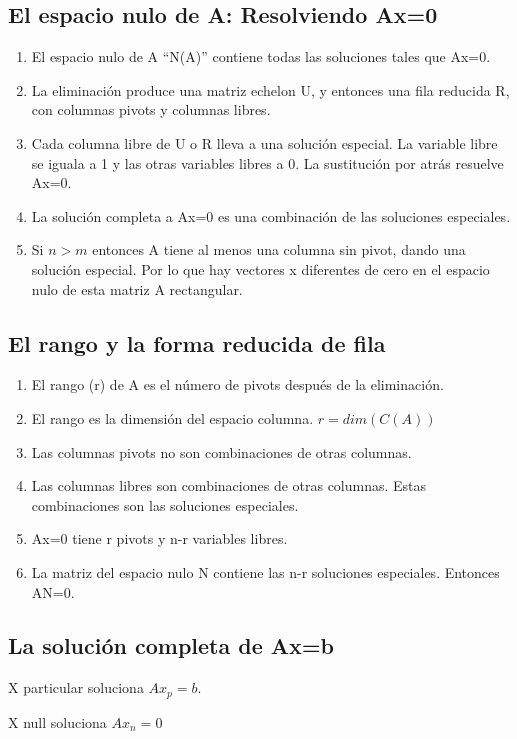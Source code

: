 \documentclass[]{article}
\begin{document}
\subsection{El espacio nulo de A: Resolviendo Ax=0}
\begin{enumerate}
	\item El espacio nulo de A ``N(A)'' contiene todas las soluciones tales que Ax=0.
	\item La eliminaci\'on produce una matriz echelon U, y entonces una fila reducida R, con columnas pivots y columnas libres.
	\item Cada columna libre de U o R lleva a una soluci\'on especial. La variable libre se iguala a 1 y las otras variables libres a 0. La sustituci\'on por atr\'as resuelve Ax=0.
	\item La soluci\'on completa a Ax=0 es una combinaci\'on de las soluciones especiales.
	\item Si $n>m$ entonces A tiene al menos una columna sin pivot, dando una soluci\'on especial. Por lo que hay vectores x diferentes de cero en el espacio nulo de esta matriz A rectangular.
\end{enumerate}

\subsection{El rango y la forma reducida de fila}
\begin{enumerate}
	\item El rango (r) de A es el n\'umero de pivots despu\'es de la eliminaci\'on.
	\item El rango es la dimensi\'on del espacio columna. $r=dim(C(A))$
	\item Las columnas pivots no son combinaciones de otras columnas.
	\item Las columnas libres son combinaciones de otras columnas. Estas combinaciones son las soluciones especiales.
	\item Ax=0 tiene r pivots y n-r variables libres.
	\item La matriz del espacio nulo N contiene las n-r soluciones especiales. Entonces AN=0.
\end{enumerate}

\subsection{La soluci\'on completa de Ax=b}
X particular soluciona $Ax_p=b$.

X null soluciona $Ax_n=0$
\end{document}
